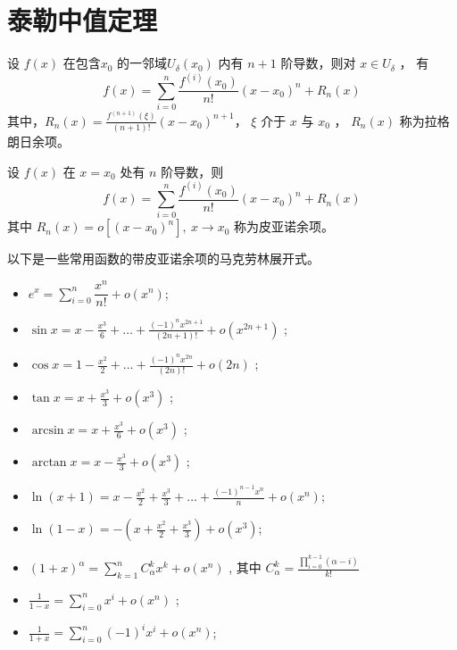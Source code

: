 \section{泰勒中值定理}

\begin{Theo}[带拉格朗日余项的泰勒中值定理]

    设 $ f(x) $ 在包含$ x_0 $ 的一邻域$ U_\delta(x_0) $ 内有 $ n+1 $ 阶导数，则对 $ x\in U_\delta $ ，
    有$$
        f(x) = \sum_{i=0}^n \frac{f^{(i)}(x_0)}{n!}(x-x_0)^n + R_n(x)
    $$ 
    其中，$ R_n(x)=\frac{f^{(n+1)}(\xi)}{(n+1)!}(x-x_0)^{n+1} $， $ \xi $ 介于 $ x $ 与 $ x_0 $ ，
    $ R_n(x) $ 称为拉格朗日余项。
\end{Theo}

\begin{Theo}[带皮亚诺余项的泰勒定理]

    设 $ f(x) $ 在 $ x=x_0 $ 处有 $ n $ 阶导数，则$$
        f(x) = \sum_{i=0}^n \frac{f^{(i)}(x_0)}{n!}(x-x_0)^n + R_n(x)
    $$ 其中 $ R_n(x)=o[(x-x_0)^n],\ x\rightarrow x_0 $ 称为皮亚诺余项。
\end{Theo}

以下是一些常用函数的带皮亚诺余项的马克劳林展开式。

\begin{itemize}
    \item $\displaystyle e^x = \sum_{i=0}^n \dfrac{x^n}{n!}+ o(x^n)$;
    \item $\displaystyle \sin x = x - \frac{x^3}{6} + \dots + \frac{(-1)^{n}x^{2n+1}}{(2n+1)!} + o(x^{2n+1}) $ ;
    \item $\displaystyle \cos x = 1 - \frac{x^2}{2} + \dots + \frac{(-1)^{n}x^{2n}}{(2n)!} + o(2n)$ ;
    \item $\displaystyle \tan x = x + \frac{x^3}{3} + o(x^3)$ ;
    \item $\displaystyle \arcsin x = x + \frac{x^3}{6} +o(x^3)$ ;
    \item $\displaystyle \arctan x = x - \frac{x^3}{3} + o(x^3)$ ;
    \item $\displaystyle \ln (x+1) = x - \frac{x^2}{2} + \frac{x^3}{3} + \dots + \frac{(-1)^{n-1}x^n}{n} + o(x^n) $;
    \item $\displaystyle \ln(1-x) = -(x+\frac{x^2}{2} + \frac{x^3}{3}) + o(x^3)$;
    \item $\displaystyle (1+x)^\alpha = \sum_{k=1}^n C_\alpha^kx^k + o(x^n) $ ,
    其中 $\displaystyle C_\alpha^k=\frac{\prod_{i = 0}^{k-1}(\alpha - i)}{k!} $ 
    \item $\displaystyle \frac{1}{1-x} = \sum_{i=0}^n x^i + o(x^n) $ ;
    \item $\displaystyle \frac{1}{1+x} = \sum_{i=0}^n (-1)^i x^i + o(x^n) $;
\end{itemize}


